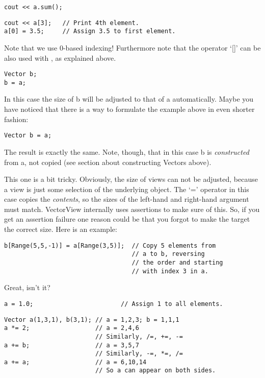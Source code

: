 \begin{verbatim}
cout << a.sum();
\end{verbatim}

\begin{verbatim}
cout << a[3];   // Print 4th element.
a[0] = 3.5;     // Assign 3.5 to first element.
\end{verbatim}

Note that we use 0-based indexing! Furthermore note that the operator
`[]' can be also used with , as explained above.

\begin{verbatim}
Vector b;
b = a;
\end{verbatim}
In this case the size of b will be adjusted to that of a
automatically. Maybe you have noticed that there is a way to formulate the 
example above in even shorter fashion:
\begin{verbatim}
Vector b = a;
\end{verbatim}
The result is exactly the same. Note, though, that in this case b is
\emph{constructed} from a, not copied (see section about constructing
Vectors above). 

This one is a bit tricky. Obviously, the size of views can not be
adjusted, because a view is just some selection of the underlying
object. The `=' operator in this case copies the
\emph{contents}, so the sizes of the left-hand and right-hand argument
must match. VectorView internally uses assertions to make sure of
this. So, if you get an assertion failure one reason could be that you
forgot to make the target the correct size. Here is an example:
\begin{verbatim}
b[Range(5,5,-1)] = a[Range(3,5)];  // Copy 5 elements from 
                                   // a to b, reversing 
                                   // the order and starting
                                   // with index 3 in a.
\end{verbatim}
Great, isn't it?

\begin{verbatim}
a = 1.0;                        // Assign 1 to all elements.
\end{verbatim}

\begin{verbatim}
Vector a(1,3,1), b(3,1); // a = 1,2,3; b = 1,1,1
a *= 2;                  // a = 2,4,6
                         // Similarly, /=, +=, -=
a += b;                  // a = 3,5,7
                         // Similarly, -=, *=, /=
a += a;                  // a = 6,10,14
                         // So a can appear on both sides.
\end{verbatim}

